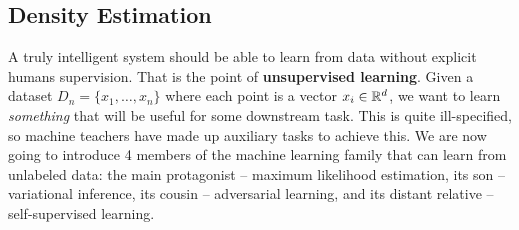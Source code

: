\subsection{Density Estimation}
\label{sec:unsupervised_learning}
A truly intelligent system should be able to learn from data without explicit humans supervision. That is the point of \textbf{unsupervised learning}. Given a dataset $D_n = \{x_1, \dots, x_n\}$ where each point is a vector $x_i \in \mathbb{R}^d$, we want to learn \textit{something} that will be useful for some downstream task. This is quite ill-specified, so machine teachers have made up auxiliary tasks to achieve this. We are now going to introduce 4 members of the machine learning family that can learn from unlabeled data: the main protagonist -- maximum likelihood estimation, its son -- variational inference, its cousin -- adversarial learning, and its distant relative -- self-supervised learning.

